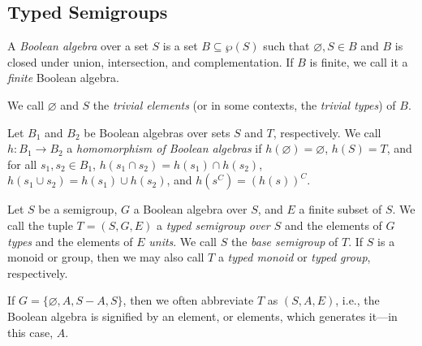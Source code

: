 \documentclass[a4paper,UKenglish,cleveref, autoref, thm-restate, anonymous]{lipics-v2021}
\begin{document}


\subsection{Typed Semigroups}\label{sec:backgroundtyped}


\begin{definition}
    A \emph{Boolean algebra} over a set $S$ is a set $B \subseteq \wp(S)$ such that $\varnothing, S \in B$ and $B$ is closed under union, intersection, and complementation. If $B$ is finite, we call it a \emph{finite} Boolean algebra.

    We call $\varnothing$ and $S$ the \emph{trivial elements} (or in some contexts, the \emph{trivial types}) of $B$.
\end{definition}

\begin{definition}
    Let $B_1$ and $B_2$ be Boolean algebras over sets $S$ and $T$, respectively. We call $h : B_1 \rightarrow B_2$ a \emph{homomorphism of Boolean algebras} if $h(\varnothing) = \varnothing$, $h(S) = T$, and for all $s_1, s_2 \in B_1$, $h(s_1 \cap s_2) = h(s_1) \cap h(s_2)$, $h(s_1 \cup s_2) = h(s_1) \cup h(s_2)$, and $h(s^C) = (h(s))^C$.
\end{definition}

\begin{definition}
    Let $S$ be a semigroup, $G$ a Boolean algebra over $S$, and $E$ a finite subset of $S$. We call the tuple $T = (S, G, E)$ a \emph{typed semigroup over $S$} and the elements of $G$ \emph{types} and the elements of $E$ \emph{units}. We call $S$ the \emph{base semigroup} of $T$. If $S$ is a monoid or group, then we may also call $T$ a \emph{typed monoid} or \emph{typed group}, respectively.

    If $G = \{\varnothing, A, S - A, S\}$, then we often abbreviate $T$ as $(S, A, E)$, i.e., the Boolean algebra is signified by an element, or elements, which generates it---in this case, $A$. 
\end{definition}
\end{document}

